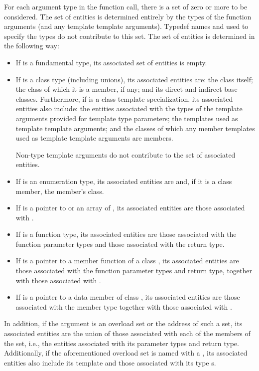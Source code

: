 \pnum
For each argument type  in the function call,
there is a set of zero or more 
to be considered.
The set of entities is determined entirely by
the types of the function arguments
(and any template template arguments).
Typedef names and 
used to specify the types
do not contribute to this set.
The set of entities
is determined in the following way:
\begin{itemize}
\item If  is a fundamental type, its associated set of
entities is empty.

\item If  is a class type (including unions),
its associated entities are:
the class itself;
the class of which it is a member, if any;
and its direct and indirect base classes.
Furthermore, if  is a class template specialization,
its associated entities also include:
the entities
associated with the types of the template arguments
provided for template type parameters;
the templates used as template template arguments; and
the classes of which any member templates used as template template
arguments are members.
\begin{note}
Non-type template arguments do not
contribute to the set of associated entities.
\end{note}

\item If  is an enumeration type,
its associated entities are 
and, if it is a class member, the member's class.

\item If  is a pointer to  or an array of ,
its associated entities are those associated with .

\item If  is a function type, its associated
entities are those associated with the function parameter types and those
associated with the return type.

\item If  is a pointer to a member function of a class
, its associated entities are those associated
with the function parameter types and return type, together with those
associated with .

\item If  is a pointer to a data member of class , its
associated entities are those associated with the member
type together with those associated with .
\end{itemize}
In addition, if the argument is an overload set or the address of such a set,
its associated entities
are the union of those associated with each of the
members of the set, i.e., the entities associated with its
parameter types and return type.
Additionally, if the aforementioned overload set is named with
a , its associated entities also include
its template  and
those associated with its type s.

